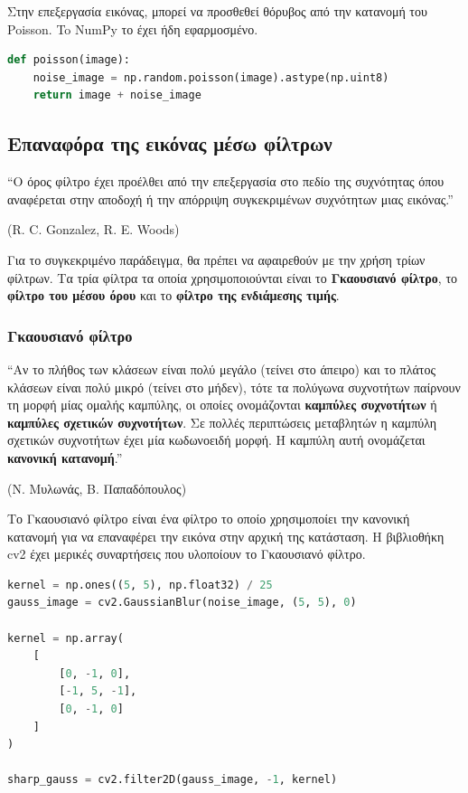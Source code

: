 Στην επεξεργασία εικόνας, μπορεί να προσθεθεί θόρυβος από την κατανομή του Poisson. To NumPy το έχει ήδη εφαρμοσμένο.

\begin{lstlisting}[language=Python, caption=Poisson]
def poisson(image):
    noise_image = np.random.poisson(image).astype(np.uint8)
    return image + noise_image
\end{lstlisting}

\subsection{Επαναφόρα της εικόνας μέσω φίλτρων}

\begin{problem}
	``Ο όρος φίλτρο έχει προέλθει από την επεξεργασία στο πεδίο της συχνότητας όπου αναφέρεται στην αποδοχή ή την απόρριψη συγκεκριμένων συχνότητων μιας εικόνας.''

	(R. C. Gonzalez, R. E. Woods)
\end{problem}

Για το συγκεκριμένο παράδειγμα, θα πρέπει να αφαιρεθούν με την χρήση τρίων φίλτρων. Τα τρία φίλτρα τα οποία χρησιμοποιούνται είναι το \textbf{Γκαουσιανό φίλτρο}, το \textbf{φίλτρο του μέσου όρου} και το \textbf{φίλτρο της ενδιάμεσης τιμής}.

\subsubsection{Γκαουσιανό φίλτρο}

\begin{problem}
	``Αν το πλήθος των κλάσεων είναι πολύ μεγάλο (τείνει στο άπειρο) και το πλάτος κλάσεων είναι πολύ μικρό (τείνει στο μήδεν), τότε τα πολύγωνα συχνοτήτων παίρνουν τη μορφή μίας ομαλής καμπύλης, οι οποίες ονομάζονται \textbf{καμπύλες συχνοτήτων} ή \textbf{καμπύλες σχετικών συχνοτήτων}.
	Σε πολλές περιπτώσεις μεταβλητών η καμπύλη σχετικών συχνοτήτων έχει μία κωδωνοειδή μορφή. Η καμπύλη αυτή ονομάζεται \textbf{κανονική κατανομή}.''

	(Ν. Μυλωνάς, Β. Παπαδόπουλος)
\end{problem}

Το Γκαουσιανό φίλτρο είναι ένα φίλτρο το οποίο χρησιμοποίει την κανονική κατανομή για να επαναφέρει την εικόνα στην αρχική της κατάσταση. Η βιβλιοθήκη cv2 έχει μερικές συναρτήσεις που υλοποίουν το Γκαουσιανό φίλτρο.

\begin{lstlisting}[language=Python, caption=Gauss Sharp]
kernel = np.ones((5, 5), np.float32) / 25
gauss_image = cv2.GaussianBlur(noise_image, (5, 5), 0)

kernel = np.array(
    [   
        [0, -1, 0],
        [-1, 5, -1],
        [0, -1, 0]
    ]
)

sharp_gauss = cv2.filter2D(gauss_image, -1, kernel)
\end{lstlisting}

